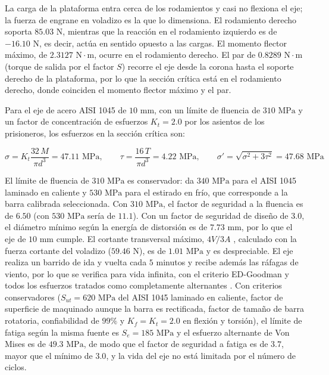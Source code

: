 \documentclass[../../General.tex]{subfiles}
\begin{document}
La carga de la plataforma entra cerca de los rodamientos y casi no flexiona el eje; la fuerza de engrane en voladizo es la que lo dimensiona. El rodamiento derecho soporta $85.03\text{ N}$, mientras que la reacción en el rodamiento izquierdo es de $-16.10\text{ N}$, es decir, actúa en sentido opuesto a las cargas. El momento flector máximo, de $2.3127\text{ N}\cdot\text{m}$, ocurre en el rodamiento derecho. El par de $0.8289\text{ N}\cdot\text{m}$ (torque de salida por el factor $S$) recorre el eje desde la corona hasta el soporte derecho de la plataforma, por lo que la sección crítica está en el rodamiento derecho, donde coinciden el momento flector máximo y el par.

Para el eje de acero AISI 1045 de $10\text{ mm}$, con un límite de fluencia de $310\text{ MPa}$ \citep{asm2002steels} y un factor de concentración de esfuerzos $K_t = 2.0$ por los asientos de los prisioneros, los esfuerzos en la sección crítica son:

\begin{equation}\label{eq:esfuerzos_eje_tilt}
    \sigma = K_t \frac{32\, M}{\pi d^3} = 47.11\text{ MPa}, \qquad
    \tau = \frac{16\, T}{\pi d^3} = 4.22\text{ MPa}, \qquad
    \sigma' = \sqrt{\sigma^2 + 3\tau^2} = 47.68\text{ MPa}
\end{equation}

El límite de fluencia de $310\text{ MPa}$ es conservador: \citet{Shigley11th} da $340\text{ MPa}$ para el AISI 1045 laminado en caliente y $530\text{ MPa}$ para el estirado en frío, que corresponde a la barra calibrada seleccionada. Con $310\text{ MPa}$, el factor de seguridad a la fluencia es de $6.50$ (con $530\text{ MPa}$ sería de $11.1$). Con un factor de seguridad de diseño de $3.0$, el diámetro mínimo según la energía de distorsión es de $7.73\text{ mm}$, por lo que el eje de $10\text{ mm}$ cumple. El cortante transversal máximo, $4V/3A$ \citep{Shigley11th}, calculado con la fuerza cortante del voladizo ($59.46\text{ N}$), es de $1.01\text{ MPa}$ y es despreciable.
El eje realiza un barrido de ida y vuelta cada $5$ minutos y recibe además las ráfagas de viento, por lo que se verifica para vida infinita, con el criterio ED-Goodman y todos los esfuerzos tratados como completamente alternantes \citep{Shigley11th}. Con criterios conservadores ($S_{ut} = 620\text{ MPa}$ del AISI 1045 laminado en caliente, factor de superficie de maquinado aunque la barra es rectificada, factor de tamaño de barra rotatoria, confiabilidad de $99\%$ y $K_f = K_t = 2.0$ en flexión y torsión), el límite de fatiga según la misma fuente es $S_e = 185\text{ MPa}$ y el esfuerzo alternante de Von Mises es de $49.3\text{ MPa}$, de modo que el factor de seguridad a fatiga es de $3.7$, mayor que el mínimo de $3.0$, y la vida del eje no está limitada por el número de ciclos.
\end{document}
